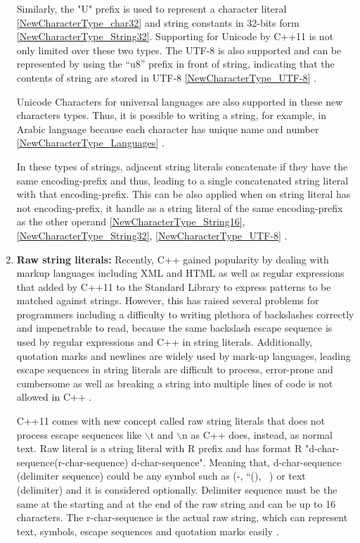 \documentclass[11pt]{report}
\begin{document}
\begin{enumerate}
Similarly, the "U" prefix is used to represent a character literal \ref{NewCharacterType_char32} and string constants in 32-bits form \ref{NewCharacterType_String32}.  Supporting for Unicode by C++11 is not only limited over these two types. The UTF-8 is also supported and can be represented by using the “u8” prefix in front of string, indicating that the contents of string are stored in UTF-8 \ref{NewCharacterType_UTF-8} \cite{Josuttis:2012:CppStandardLibrary}.
\newline

Unicode Characters for universal languages are also supported in these new characters types. Thus, it is possible to writing a string, for example, in Arabic language because each character has unique name and number \ref{NewCharacterType_Languages} \cite{Josuttis:2012:CppStandardLibrary}.
\newline

In these types of strings, adjacent string literals concatenate if they have the same encoding-prefix and thus, leading to a single concatenated string literal with that encoding-prefix. This can be also applied when on string literal has not encoding-prefix, it handle as a string literal of the same encoding-prefix as the other operand \ref{NewCharacterType_String16}, \ref{NewCharacterType_String32}, \ref{NewCharacterType_UTF-8} \cite{ ISO:2011:Cpplanguage}.


\item \textbf{Raw string literals:} Recently, C++ gained popularity by dealing with markup languages including XML and HTML as well as regular expressions that added by C++11 to the Standard Library to express patterns to be matched against strings. However, this has raised several problems for programmers including a difficulty to writing plethora of backslashes correctly and impenetrable to read, because the same backslash escape sequence is used by regular expressions and C++ in string literals. Additionally, quotation marks and newlines are widely used by mark-up languages, leading escape sequences in string literals are difficult to process, error-prone and cumbersome as well as breaking a string into multiple lines of code is not allowed in C++ \cite{ISO:2011:Cpplanguage}.
\newline

C++11 comes with new concept called raw string literals that does not process escape sequences like $\backslash$t and $\backslash$n as C++ does, instead, as normal text. Raw literal is a string literal with R prefix and has format R "d-char-sequence(r-char-sequence) d-char-sequence". Meaning that, d-char-sequence (delimiter sequence) could be any symbol such as (-, “(), ~) or text (delimiter) and it is considered optionally. Delimiter sequence must be the same at the starting and at the end of the raw string and can be up to 16 characters. The r-char-sequence is the actual raw string, which can represent text, symbols, escape sequences and quotation marks easily \cite{Gregorie:professionalcpp}.
\newline


\end{enumerate}
\end{document}
